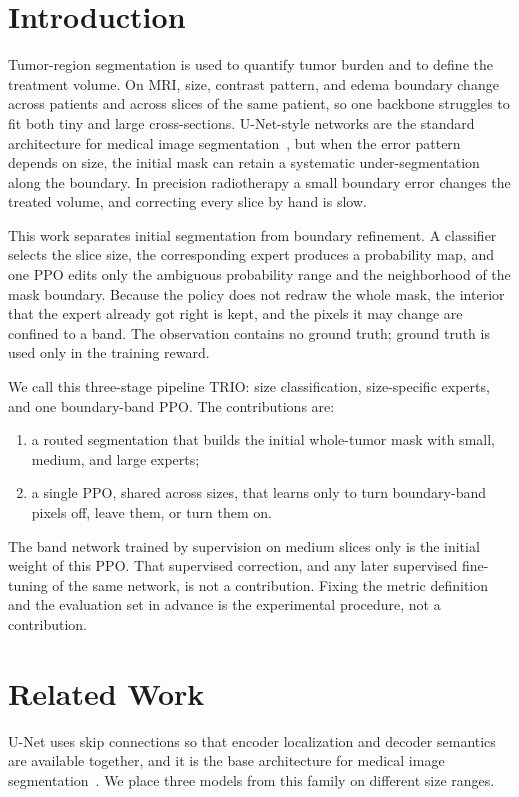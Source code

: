 \documentclass[runningheads]{llncs}
\begin{document}
\section{Introduction}

Tumor-region segmentation is used to quantify tumor burden and to define the treatment volume. On MRI, size, contrast pattern, and edema boundary change across patients and across slices of the same patient, so one backbone struggles to fit both tiny and large cross-sections. U-Net-style networks are the standard architecture for medical image segmentation~\cite{ronneberger2015}, but when the error pattern depends on size, the initial mask can retain a systematic under-segmentation along the boundary. In precision radiotherapy a small boundary error changes the treated volume, and correcting every slice by hand is slow.

This work separates initial segmentation from boundary refinement. A classifier selects the slice size, the corresponding expert produces a probability map, and one PPO edits only the ambiguous probability range and the neighborhood of the mask boundary. Because the policy does not redraw the whole mask, the interior that the expert already got right is kept, and the pixels it may change are confined to a band. The observation contains no ground truth; ground truth is used only in the training reward.

We call this three-stage pipeline TRIO: size classification, size-specific experts, and one boundary-band PPO. The contributions are:
\begin{enumerate}
\item a routed segmentation that builds the initial whole-tumor mask with small, medium, and large experts;
\item a single PPO, shared across sizes, that learns only to turn boundary-band pixels off, leave them, or turn them on.
\end{enumerate}
The band network trained by supervision on medium slices only is the initial weight of this PPO. That supervised correction, and any later supervised fine-tuning of the same network, is not a contribution. Fixing the metric definition and the evaluation set in advance is the experimental procedure, not a contribution.

\section{Related Work}

U-Net uses skip connections so that encoder localization and decoder semantics are available together, and it is the base architecture for medical image segmentation~\cite{ronneberger2015}. We place three models from this family on different size ranges.
\end{document}
